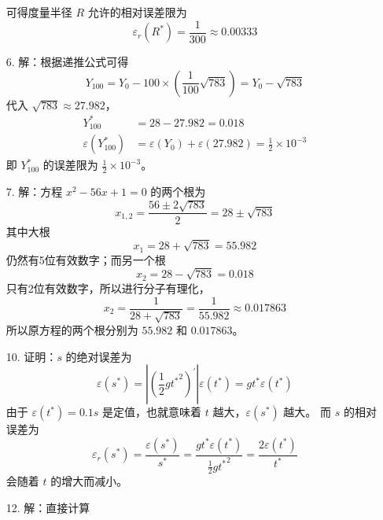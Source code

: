 \documentclass{sjtuarticle}
\begin{document}
\begin{itemize}
\begin{equation*}
    \end{equation*}
    可得度量半径 $R$ 允许的相对误差限为
    \begin{equation*}
        \varepsilon_r(R^*)=\frac{1}{300}\approx 0.00333
    \end{equation*}
    \item[6.] 解：根据递推公式可得
    \begin{equation*}
        Y_{100}=Y_0-100\times\left(\frac{1}{100}\sqrt{783}\right)=Y_0-\sqrt{783}
    \end{equation*}
    代入 $\sqrt{783}\approx 27.982$，
    \begin{align*}
        Y_{100}^*&=28-27.982=0.018\\
        \varepsilon(Y_{100}^*)&=\varepsilon(Y_0)+\varepsilon(27.982)=\frac{1}{2}\times 10^{-3}
    \end{align*}
    即 $Y_{100}^*$ 的误差限为 $\frac{1}{2}\times 10^{-3}$。
    \item[7.] 解：方程 $x^2-56x+1=0$ 的两个根为
    \begin{equation*}
        x_{1,2}=\frac{56\pm 2\sqrt{783}}{2}=28\pm \sqrt{783}
    \end{equation*}
    其中大根
    \begin{equation*}
        x_1=28+\sqrt{783}=55.982
    \end{equation*}
    仍然有5位有效数字；而另一个根
    \begin{equation*}
        x_2=28-\sqrt{783}=0.018
    \end{equation*}
    只有2位有效数字，所以进行分子有理化，
    \begin{equation*}
        x_2=\frac{1}{28+\sqrt{783}}=\frac{1}{55.982}\approx 0.017863
    \end{equation*}
    所以原方程的两个根分别为 $55.982$ 和 $0.017863$。
    \item[10.] 证明：$s$ 的绝对误差为
    \begin{equation*}
        \varepsilon(s^*)=\left|\left(\frac{1}{2}g{t^*}^2\right)^\prime\right|\varepsilon(t^*)=gt^*\varepsilon(t^*)
    \end{equation*}
    由于 $\varepsilon(t^*)=0.1s$ 是定值，也就意味着 $t$ 越大，$\varepsilon(s^*)$ 越大。
    而 $s$ 的相对误差为
    \begin{equation*}
        \varepsilon_r(s^*)=\frac{\varepsilon(s^*)}{s^*}=\frac{gt^*\varepsilon(t^*)}{\frac{1}{2}g{t^*}^2}=\frac{2\varepsilon(t^*)}{t^*}
    \end{equation*}
    会随着 $t$ 的增大而减小。
    \item[12.] 解：直接计算

\end{itemize}
\end{document}
